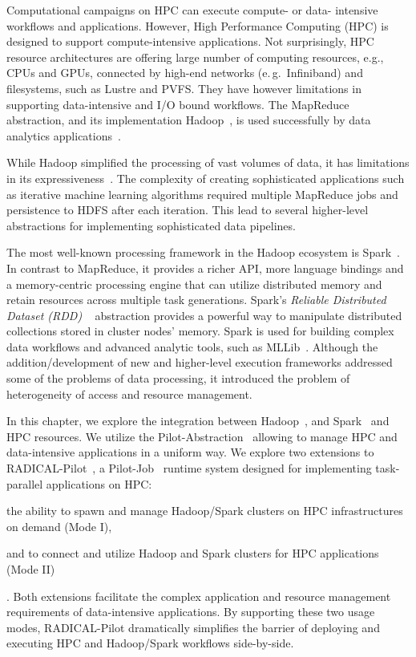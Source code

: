 \label{sec:pilot-data-hadoop}

Computational campaigns on HPC can execute compute- or data- intensive workflows and applications.
However, High Performance Computing (HPC) is designed to support compute-intensive applications.
Not surprisingly, HPC resource architectures are offering large number of computing resources, e.g., CPUs and GPUs, connected by high-end networks (e.\,g.\ Infiniband) and filesystems, such as Lustre and PVFS.
They have however limitations in supporting data-intensive and I/O bound workflows.
The MapReduce~\cite{dean2004mapreduce} abstraction, and its implementation Hadoop~\cite{hadoop}, is used successfully by data analytics applications~\cite{hellerstein2012science}.

While Hadoop simplified the processing of vast volumes of data, it has limitations in its expressiveness~\cite{yelick2011magellan,isard2007dryad}.
The complexity of creating sophisticated applications such as iterative machine learning algorithms required multiple MapReduce jobs and persistence to HDFS after each iteration.
This lead to several higher-level abstractions for implementing sophisticated data pipelines.

The most well-known processing framework in the Hadoop ecosystem is Spark~\cite{zaharia2010spark}.
In contrast to MapReduce, it provides a richer API, more language bindings and a memory-centric processing engine that can utilize distributed memory and retain resources across multiple task generations.
Spark's \emph{Reliable Distributed Dataset (RDD)} ~\cite{zaharia2012resilient} abstraction provides a powerful way to manipulate distributed collections stored in cluster nodes' memory.
Spark is used for building complex data workflows and advanced analytic tools, such as MLLib~\cite{mllib}.
Although the addition/development of new and higher-level execution frameworks addressed some of the problems of data processing, it introduced the problem of heterogeneity of access and resource management.

In this chapter, we explore the integration between Hadoop~\cite{hadoop}, and Spark~\cite{zaharia2010spark} and HPC resources.
We utilize the Pilot-Abstraction~\cite{luckow2012pstar} allowing to manage HPC and data-intensive applications in a uniform way.
We explore two extensions to RADICAL-Pilot~\cite{merzky2018design}, a Pilot-Job~\cite{luckow2012pstar} runtime system designed for implementing task-parallel applications on HPC: 
\begin{inparaenum}[(i)]
    \item the ability to spawn and manage Hadoop/Spark clusters on HPC infrastructures on demand (Mode I),
    \item and to connect and utilize Hadoop and Spark clusters for HPC applications (Mode II)
\end{inparaenum}.
Both extensions facilitate the complex application and resource management requirements of data-intensive applications.
By supporting these two usage modes, RADICAL-Pilot dramatically simplifies the barrier of deploying and executing HPC and Hadoop/Spark workflows side-by-side.

